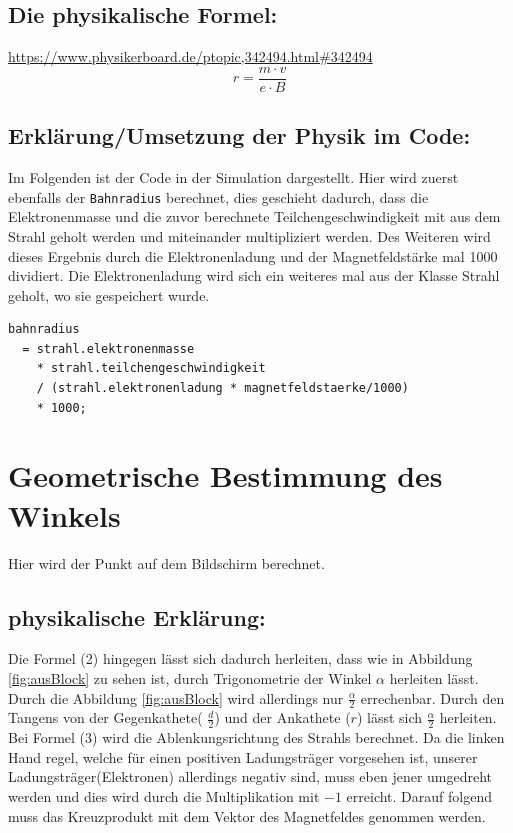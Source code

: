 \subsection{Die physikalische Formel:}
\url{https://www.physikerboard.de/ptopic,342494.html#342494}
\begin{equation}
     \label{eq:r}
     r = \frac{m \cdot v}{e \cdot B}
\end{equation}


\subsection{Erklärung/Umsetzung der Physik im Code:}

Im Folgenden ist der Code in der Simulation dargestellt. Hier wird zuerst ebenfalls der \lstinline$Bahnradius$ berechnet, dies geschieht dadurch, dass die Elektronenmasse und die zuvor berechnete Teilchengeschwindigkeit mit aus dem Strahl geholt werden und miteinander multipliziert werden. Des Weiteren wird dieses Ergebnis durch die Elektronenladung und der Magnetfeldstärke mal 1000 dividiert. Die Elektronenladung wird sich ein weiteres mal aus der Klasse Strahl geholt, wo sie gespeichert wurde.
\begin{lstlisting}
bahnradius
  = strahl.elektronenmasse
    * strahl.teilchengeschwindigkeit
    / (strahl.elektronenladung * magnetfeldstaerke/1000)
    * 1000;
\end{lstlisting}

\section{Geometrische Bestimmung des Winkels}

Hier wird der Punkt auf dem Bildschirm berechnet.
\subsection{physikalische Erklärung:}
Die Formel (2) hingegen lässt sich dadurch herleiten, dass wie in Abbildung \ref{fig:ausBlock} zu sehen ist, durch Trigonometrie der Winkel $\alpha$ herleiten lässt. Durch die Abbildung \ref{fig:ausBlock} wird allerdings nur $\frac{\alpha}{2}$ errechenbar. Durch den Tangens von der Gegenkathete( $ \frac{d}{2}$) und der Ankathete ($ r $) lässt sich $ \frac{\alpha}{2}$ herleiten. Bei Formel (3) wird die Ablenkungsrichtung des Strahls berechnet. Da die linken Hand regel, welche für einen positiven Ladungsträger vorgesehen ist, unserer Ladungsträger(Elektronen) allerdings negativ sind, muss eben jener umgedreht werden und dies wird durch die Multiplikation mit $ -1 $ erreicht. Darauf folgend muss das Kreuzprodukt mit dem Vektor des Magnetfeldes genommen werden.
